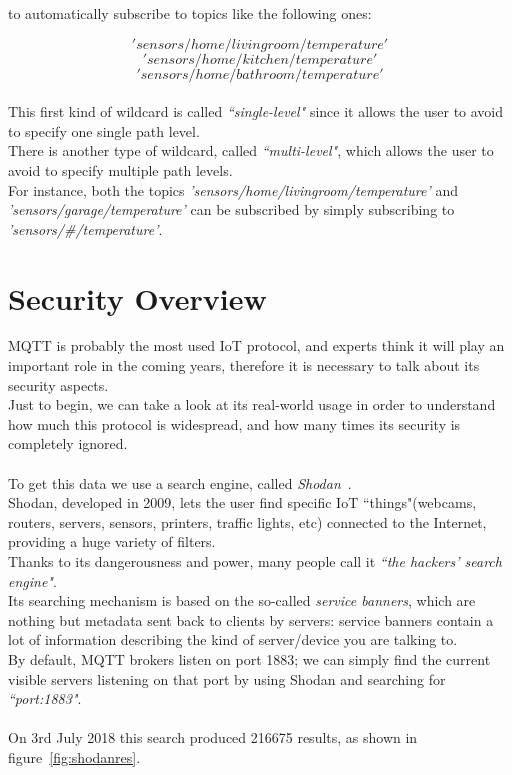 \documentclass[12pt]{report}
\begin{document}
{to automatically subscribe to topics like the following ones:

$$'sensors/home/livingroom/temperature'$$
$$'sensors/home/kitchen/temperature'$$
$$'sensors/home/bathroom/temperature'$$\\
This first kind of wildcard is called \emph{``single-level"} since it allows the user to avoid to specify one single path level. \\
There is another type of wildcard, called \emph{``multi-level"}, which allows the user to avoid to specify multiple path levels.\\
For instance, both the topics \emph{'sensors/home/livingroom/temperature'} and \emph{'sensors/garage/temperature'} can be subscribed by simply subscribing to \emph{'sensors/\#/temperature'}.\\


\chapter{Security Overview}
\bigskip
MQTT is probably the most used IoT protocol, and experts think it will play an important role in the coming years, therefore it is necessary to talk about its security aspects.\\
Just to begin, we can take a look at its real-world usage in order to understand how much this protocol is widespread, and how many times its security is completely ignored.\\\\
To get this data we use a search engine, called \emph{Shodan}~\cite{shodan}.\\	 
Shodan, developed in 2009, lets the user find specific IoT ``things"(webcams, routers, servers, sensors, printers, traffic lights, etc)  connected to the Internet, providing a huge variety of filters.\\

Thanks to its dangerousness and power, many people call it \emph{``the hackers' search engine"}.\\
Its searching mechanism is based on the so-called \emph{service banners}, which are nothing but metadata sent back to clients by servers: service banners contain a lot of information describing the kind of server/device you are talking to.\\

By default, MQTT brokers listen on port 1883; we can simply find the current visible servers listening on that port by using Shodan and searching for \emph{``port:1883"}.\\\\
On 3rd July 2018 this search produced 216675 results, as shown in figure~\ref{fig:shodanres}.\\

}
\end{document}
